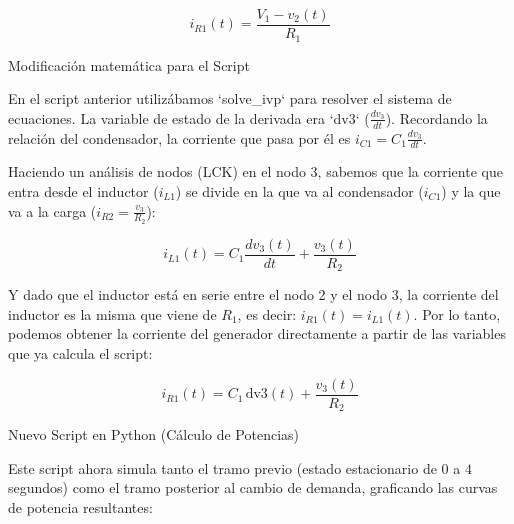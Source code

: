 \documentclass[11pt, a4paper]{article}
\theoremstyle{definition}
\theoremstyle{plain}
\theoremstyle{plain}
\theoremstyle{remark}
\theoremstyle{remark}
\theoremstyle{remark}
\begin{document}
$$i_{R1}(t) = \frac{V_1 - v_2(t)}{R_1}$$



Modificación matemática para el Script

En el script anterior utilizábamos `solve\_ivp` para resolver el sistema de ecuaciones. La variable de estado de la derivada era `dv3` ($\frac{dv_3}{dt}$). Recordando la relación del condensador, la corriente que pasa por él es $i_{C1} = C_1 \frac{dv_3}{dt}$.

Haciendo un análisis de nodos (LCK) en el nodo 3, sabemos que la corriente que entra desde el inductor ($i_{L1}$) se divide en la que va al condensador ($i_{C1}$) y la que va a la carga ($i_{R2} = \frac{v_3}{R_2}$):


$$i_{L1}(t) = C_1 \frac{dv_3(t)}{dt} + \frac{v_3(t)}{R_2}$$

Y dado que el inductor está en serie entre el nodo 2 y el nodo 3, la corriente del inductor es la misma que viene de $R_1$, es decir: $i_{R1}(t) = i_{L1}(t)$. Por lo tanto, podemos obtener la corriente del generador directamente a partir de las variables que ya calcula el script:


$$i_{R1}(t) = C_1 \,  \text{dv3}(t) + \frac{v_3(t)}{R_2}$$



Nuevo Script en Python (Cálculo de Potencias)

Este script ahora simula tanto el tramo previo (estado estacionario de $0$ a $4$ segundos) como el tramo posterior al cambio de demanda, graficando las curvas de potencia resultantes:
\end{document}
